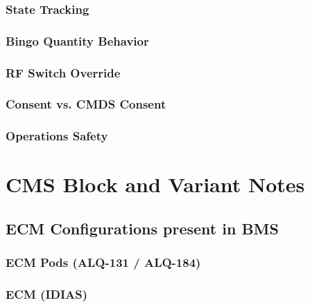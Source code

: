 \documentclass[11pt, a4paper, twoside]{report}
\begin{document}
\subsubsection{State Tracking}
\label{sec:C5-S2-S4-S1}

\subsubsection{Bingo Quantity Behavior}
\label{sec:C5-S2-S4-S2}

\subsubsection{RF Switch Override}
\label{sec:C5-S2-S4-S3}

\subsubsection{Consent vs. CMDS Consent}
\label{sec:C5-S2-S4-S4}

\subsubsection{Operations Safety}
\label{sec:C5-S2-S4-S5}

\section{CMS Block and Variant Notes}
\label{sec:C5-S3}

\subsection{ECM Configurations present in BMS}
\label{sec:C5-S3-S1}

\subsubsection{ECM Pods (ALQ-131 / ALQ-184)}
\label{sec:C5-S3-S1-S1}

\subsubsection{ECM (IDIAS)}
\label{sec:C5-S3-S1-S2}
\end{document}
